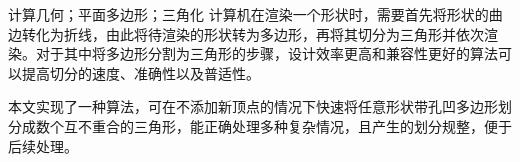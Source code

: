 
\begin{cnabstract}{计算几何；平面多边形；三角化}
  计算机在渲染一个形状时，需要首先将形状的曲边转化为折线，由此将待渲染的形状转为多边形，再将其切分为三角形并依次渲染。对于其中将多边形分割为三角形的步骤，设计效率更高和兼容性更好的算法可以提高切分的速度、准确性以及普适性。
  
  本文实现了一种算法，可在不添加新顶点的情况下快速将任意形状带孔凹多边形划分成数个互不重合的三角形，能正确处理多种复杂情况，且产生的划分规整，便于后续处理。
\end{cnabstract}




